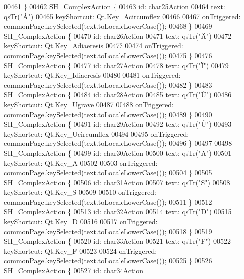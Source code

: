 \begin{DoxyCode}
00461     \}
00462     SH\_ComplexAction \{
00463         \textcolor{keywordtype}{id}: char25Action
00464         text: qsTr(\textcolor{stringliteral}{"Â"})
00465         keyShortcut: Qt.Key\_Acircumflex
00466 
00467         onTriggered: commonPage.keySelected(text.toLocaleLowerCase());
00468     \}
00469     SH\_ComplexAction \{
00470         \textcolor{keywordtype}{id}: char26Action
00471         text: qsTr(\textcolor{stringliteral}{"Ä"})
00472         keyShortcut: Qt.Key\_Adiaeresis
00473 
00474         onTriggered: commonPage.keySelected(text.toLocaleLowerCase());
00475     \}
00476     SH\_ComplexAction \{
00477         \textcolor{keywordtype}{id}: char27Action
00478         text: qsTr(\textcolor{stringliteral}{"Ï"})
00479         keyShortcut: Qt.Key\_Idiaeresis
00480 
00481         onTriggered: commonPage.keySelected(text.toLocaleLowerCase());
00482     \}
00483     SH\_ComplexAction \{
00484         \textcolor{keywordtype}{id}: char28Action
00485         text: qsTr(\textcolor{stringliteral}{"Ù"})
00486         keyShortcut: Qt.Key\_Ugrave
00487 
00488         onTriggered: commonPage.keySelected(text.toLocaleLowerCase());
00489     \}
00490     SH\_ComplexAction \{
00491         \textcolor{keywordtype}{id}: char29Action
00492         text: qsTr(\textcolor{stringliteral}{"Û"})
00493         keyShortcut: Qt.Key\_Ucircumflex
00494 
00495         onTriggered: commonPage.keySelected(text.toLocaleLowerCase());
00496     \}
00497 
00498     SH\_ComplexAction \{
00499         \textcolor{keywordtype}{id}: char30Action
00500         text: qsTr(\textcolor{stringliteral}{"A"})
00501         keyShortcut: Qt.Key\_A
00502 
00503         onTriggered: commonPage.keySelected(text.toLocaleLowerCase());
00504     \}
00505     SH\_ComplexAction \{
00506         \textcolor{keywordtype}{id}: char31Action
00507         text: qsTr(\textcolor{stringliteral}{"S"})
00508         keyShortcut: Qt.Key\_S
00509 
00510         onTriggered: commonPage.keySelected(text.toLocaleLowerCase());
00511     \}
00512     SH\_ComplexAction \{
00513         \textcolor{keywordtype}{id}: char32Action
00514         text: qsTr(\textcolor{stringliteral}{"D"})
00515         keyShortcut: Qt.Key\_D
00516 
00517         onTriggered: commonPage.keySelected(text.toLocaleLowerCase());
00518     \}
00519     SH\_ComplexAction \{
00520         \textcolor{keywordtype}{id}: char33Action
00521         text: qsTr(\textcolor{stringliteral}{"F"})
00522         keyShortcut: Qt.Key\_F
00523 
00524         onTriggered: commonPage.keySelected(text.toLocaleLowerCase());
00525     \}
00526     SH\_ComplexAction \{
00527         \textcolor{keywordtype}{id}: char34Action

\end{DoxyCode}
